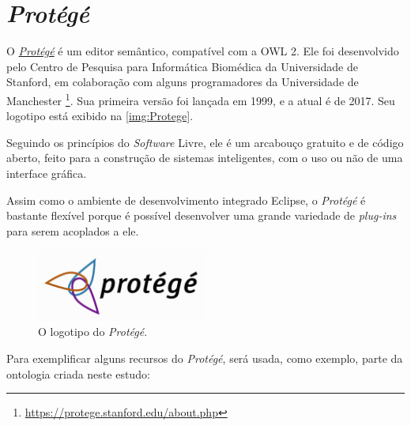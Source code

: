 \section{\textit{Protégé}}

O \href{https://protege.stanford.edu}{\textit{Protégé}} é um editor semântico, compatível com a OWL 2. Ele foi desenvolvido pelo Centro de Pesquisa para Informática Biomédica da Universidade de Stanford, em colaboração com alguns programadores da Universidade de Manchester \footnote{\url{https://protege.stanford.edu/about.php}}. Sua primeira versão foi lançada em 1999, e a atual é de 2017. Seu logotipo está exibido na \autoref{img:Protege}.

Seguindo os princípios do \textit{Software} Livre, ele é um arcabouço gratuito e de código aberto, feito para a construção de sistemas inteligentes, com o uso ou não de uma interface gráfica.

Assim como o ambiente de desenvolvimento integrado Eclipse, o \textit{Protégé} é bastante flexível porque é possível desenvolver uma grande variedade de \textit{plug-ins} para serem acoplados a ele.

\begin{figure}[H]
	\centering
	\includegraphics[width=0.5\textwidth]{Capitulos/Ferramentas/protege}
	\caption{O logotipo do \textit{Protégé}.}
	\label{img:Protege}
\end{figure}

Para exemplificar alguns recursos do \textit{Protégé}, será usada, como exemplo, parte da ontologia criada neste estudo:

